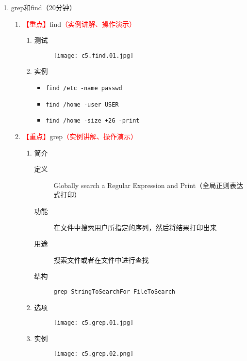 \documentclass{TIJMUjiaoanLL}
\begin{document}
\begin{enumerate}
\otherTail
\newpage
\otherHeader


  \item grep和find（20分钟）
    \begin{enumerate}
      \item \textcolor{red}{【重点】}find\textcolor{red}{（实例讲解、操作演示）}
	\begin{enumerate}
	  \item 测试
	\vspace*{-10pt}
	\begin{figure}[h]
	  \centering
	  \texttt{[image: c5.find.01.jpg]}
	\end{figure}
	\vspace*{-10pt}
	  \item 实例
	    \begin{itemize}
	      \item \verb|find /etc -name passwd|
	      \item \verb|find /home -user USER|
	      \item \verb|find /home -size +2G -print|
	    \end{itemize}
	\end{enumerate}
      \item \textcolor{red}{【重点】}grep\textcolor{red}{（实例讲解、操作演示）}
	\begin{enumerate}
	  \item 简介
	  \begin{description}
	    \item[定义] Globally search a Regular Expression and Print（全局正则表达式打印）
            \item[功能] 在文件中搜索用户所指定的序列，然后将结果打印出来
            \item[用途] 搜索文件或者在文件中进行查找
            \item[结构] \verb|grep StringToSearchFor FileToSearch|
          \end{description}
	  \item 选项
	\vspace*{-10pt}
	\begin{figure}[h]
	  \centering
	  \texttt{[image: c5.grep.01.jpg]}
	\end{figure}
	\vspace*{-10pt}
	  \item 实例
	\vspace*{-10pt}
	\begin{figure}[h]
	  \centering
	  \texttt{[image: c5.grep.02.png]}
	\end{figure}
	\vspace*{-10pt}
	\end{enumerate}
    \end{enumerate}


\end{enumerate}
\end{document}
